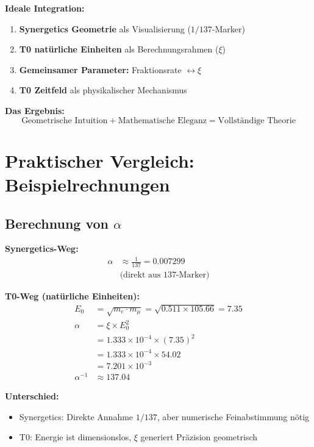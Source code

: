 \documentclass[12pt,a4paper]{article}
\newcommand{\xipar}{\xi}
\begin{document}
	\begin{gemeinsam}
		\textbf{Ideale Integration:}
		
		\begin{enumerate}
			\item \textbf{Synergetics Geometrie} als Visualisierung ($1/137$-Marker)
			\item \textbf{T0 natürliche Einheiten} als Berechnungsrahmen ($\xipar$)
			\item \textbf{Gemeinsamer Parameter:} Fraktionsrate $\leftrightarrow \xipar$
			\item \textbf{T0 Zeitfeld} als physikalischer Mechanismus
		\end{enumerate}
		
		\textbf{Das Ergebnis:}
		\begin{equation}
			\boxed{\text{Geometrische Intuition} + \text{Mathematische Eleganz} = \text{Vollständige Theorie}}
		\end{equation}
	\end{gemeinsam}
	
	\section{Praktischer Vergleich: Beispielrechnungen}
	
	\subsection{Berechnung von $\alpha$}
	
	\textbf{Synergetics-Weg:}
	\begin{align}
		\alpha &\approx \frac{1}{137} = 0.007299 \\
		&\text{(direkt aus 137-Marker)}
	\end{align}
	
	\textbf{T0-Weg (natürliche Einheiten):}
	\begin{align}
		E_0 &= \sqrt{m_e \cdot m_\mu} = \sqrt{0.511 \times 105.66} = 7.35 \\
		\alpha &= \xipar \times E_0^2 \\
		&= 1.333 \times 10^{-4} \times (7.35)^2 \\
		&= 1.333 \times 10^{-4} \times 54.02 \\
		&= 7.201 \times 10^{-3} \\
		\alpha^{-1} &\approx 137.04
	\end{align}
	
	\textbf{Unterschied:}
	\begin{itemize}
		\item Synergetics: Direkte Annahme $1/137$, aber numerische Feinabstimmung nötig
		\item T0: Energie ist dimensionslos, $\xipar$ generiert Präzision geometrisch
	\end{itemize}
	
\end{document}
